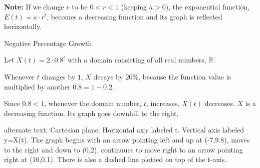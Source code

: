 \documentclass{ximera}
\begin{document}
\textbf{Note:} If we change $r$ to be $0 < r < 1$ (keeping $a>0$), the exponential function, $E(t) = a \cdot r^t$, becomes a decreasing function and its graph is reflected horizontally.







\begin{example} Negative Percentage Growth

Let $X(t) = 2 \cdot 0.8^t$ with a domain consisting of all real numbers, $\mathbb{R}$. 

Whenever $t$ changes by $1$, $X$ decays by $20\%$, because the function value is multiplied by another $0.8 = 1 - 0.2$.



Since $0.8 < 1$, whenever the domain number, $t$, increases, $X(t)$ decreases.  $X$ is a decreasing function.  Its graph goes downhill to the right.









\begin{image}
\end{image}


\textcolor{gray!90}{alternate text: Cartesian plane. Horizontal axis labeled t. Vertical axis labeled y=X(t).  The graph begins with an arrow pointing left and up at (-7,9.8), moves to the right and down to (0,2), continuues to move right to an arrow pointing right at (10,0.1). There is also a dashed line plotted on top of the t-axis.}


\end{example}
\end{document}
